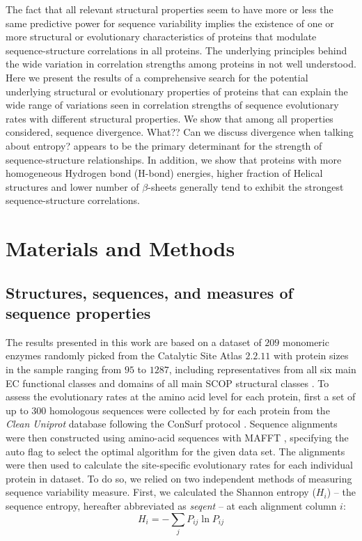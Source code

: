 \documentclass[12pt]{article}
\begin{document}
\indent The fact that all relevant structural properties seem to have more or less the same predictive power for sequence variability implies the existence of one or more structural or evolutionary characteristics of proteins that modulate sequence-structure correlations in all proteins. The underlying principles behind the wide variation in correlation strengths among proteins in not well understood. Here we present the results of a comprehensive search for the potential underlying structural or evolutionary properties of proteins that can explain the wide range of variations seen in correlation strengths of sequence evolutionary rates with different structural properties.  We show that among all properties considered, {\color{blue}sequence divergence. What?? Can we discuss divergence when talking about entropy?} appears to be the primary determinant for the strength of sequence-structure relationships. In addition, we show that proteins with more homogeneous Hydrogen bond (H-bond) energies, higher fraction of Helical structures and lower number of $\beta$-sheets generally tend to exhibit the strongest sequence-structure correlations.  \\

\section{Materials and Methods}
\label{sec:mam}

    \subsection*{Structures, sequences, and measures of sequence properties } 
    The results presented in this work are based on a dataset of $209$ monomeric enzymes \citep{Echaveetal2015} randomly picked from the Catalytic Site Atlas $2.2.11$ \citep{Porteretal2004} with protein sizes in the sample ranging from $95$ to $1287$, including representatives from all six main EC functional classes \citep{Webb1992} and domains of all main SCOP structural classes \citep{Murzinetal1995}. To assess the evolutionary rates at the amino acid level for each protein, first a set of up to $300$ homologous sequences were collected by \citep{Yehetal2014, Huangetal2014} for each protein from the {\it Clean Uniprot} database following the ConSurf protocol \citep{Goldenbergetal2008}. Sequence alignments were then constructed using amino-acid sequences with MAFFT \citep{Katohetal2002, Katohetal2005}, specifying the auto flag to select the optimal algorithm for the given data set. The alignments were then used to calculate the site-specific evolutionary rates for each individual protein in dataset. To do so, we relied on two independent methods of measuring sequence variability measure. First, we calculated the Shannon entropy ($H_i$) -- the sequence entropy, hereafter abbreviated as {\it seqent} -- at each alignment column $i$:
    \begin{equation}
        \label{eqn:shannon}
        H_i = -\sum_j P_{ij}\ln P_{ij}
    \end{equation}
\end{document}
